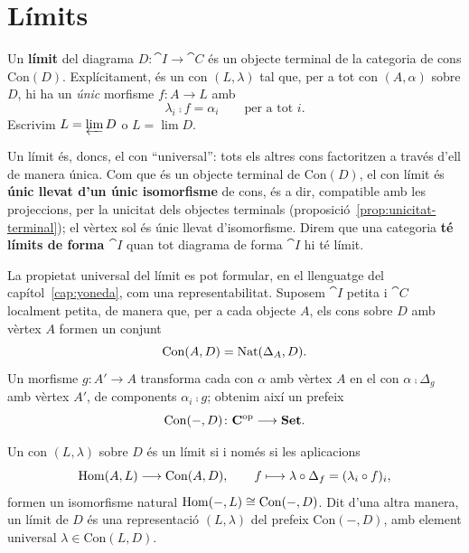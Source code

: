 \section{Límits}

\begin{definicio}[Límit]
\label{def:limit}
Un \textbf{límit} del diagrama $D\colon\cat{I}\to\cat{C}$ és un objecte terminal de la categoria de cons $\mathrm{Con}(D)$. Explícitament, és un con $(L,\lambda)$ tal que, per a tot con $(A,\alpha)$ sobre $D$, hi ha un \emph{únic} morfisme $f\colon A\to L$ amb
\[
\lambda_i\comp f=\alpha_i\qquad\text{per a tot }i.
\]
Escrivim $L=\varprojlim D$ o $L=\lim D$.
\end{definicio}

\begin{observacio}
Un límit és, doncs, el con \enquote{universal}: tots els altres cons factoritzen a través d'ell de manera única. Com que és un objecte terminal de $\mathrm{Con}(D)$, el con límit és \textbf{únic llevat d'un únic isomorfisme} de cons, és a dir, compatible amb les projeccions, per la unicitat dels objectes terminals (proposició~\ref{prop:unicitat-terminal}); el vèrtex sol és únic llevat d'isomorfisme. Direm que una categoria \textbf{té límits de forma $\cat{I}$} quan tot diagrama de forma $\cat{I}$ hi té límit.
\end{observacio}

La propietat universal del límit es pot formular, en el llenguatge del capítol~\ref{cap:yoneda}, com una representabilitat. Suposem $\cat{I}$ petita i $\cat{C}$ localment petita, de manera que, per a cada objecte $A$, els cons sobre $D$ amb vèrtex $A$ formen un conjunt
\[
\mathrm{Con}(A,D)=\operatorname{Nat}(\Delta_A,D).
\]
Un morfisme $g\colon A'\to A$ transforma cada con $\alpha$ amb vèrtex $A$ en el con $\alpha\comp\Delta_g$ amb vèrtex $A'$, de components $\alpha_i\comp g$; obtenim així un prefeix
\[
\mathrm{Con}(-,D)\colon\mathbf{C}^{\mathrm{op}}\longrightarrow\mathbf{Set}.
\]

\begin{proposicio}\label{prop:limit-representable}
Un con $(L,\lambda)$ sobre $D$ és un límit si i només si les aplicacions
\[
\operatorname{Hom}(A,L)\longrightarrow\mathrm{Con}(A,D),
\qquad
f\longmapsto\lambda\circ\Delta_f=(\lambda_i\circ f)_i,
\]
formen un isomorfisme natural $\operatorname{Hom}(-,L)\cong\mathrm{Con}(-,D)$. Dit d'una altra manera, un límit de $D$ és una representació $(L,\lambda)$ del prefeix $\mathrm{Con}(-,D)$, amb element universal $\lambda\in\mathrm{Con}(L,D)$.
\end{proposicio}

